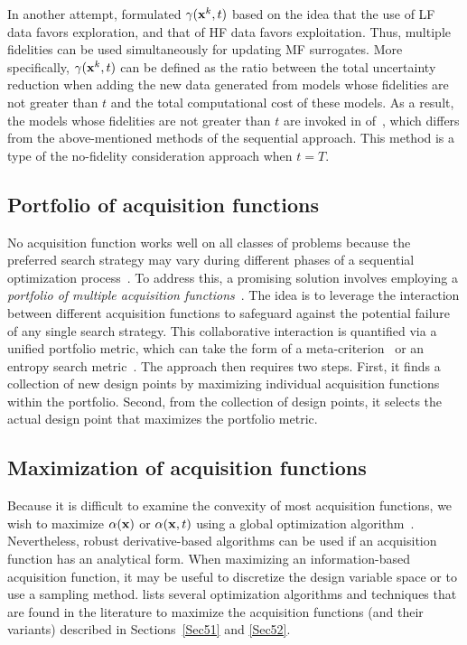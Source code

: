 \documentclass[journal ]{new-aiaa}
\begin{document}
In another attempt, \citet{Meliani2019} formulated $\gamma({\bf x}^k,t)$ based on the idea that the use of LF data favors exploration, and that of HF data favors exploitation.
Thus, multiple fidelities can be used simultaneously for updating MF surrogates.
More specifically, $\gamma({\bf x}^k,t)$ can be defined as the ratio between the total uncertainty reduction when adding the new data generated from models whose fidelities are not greater than $t$ and the total computational cost of these models.
As a result, the models whose fidelities are not greater than $t$ are invoked in  of~, which differs from the above-mentioned methods of the sequential approach.
This method is a type of the no-fidelity consideration approach when $t=T$.

\subsection{Portfolio of acquisition functions}\label{Sec53}

No acquisition function works well on all classes of problems because the preferred search strategy may vary during different phases of a sequential optimization process~\citep{Shahriari2016}.
To address this, a promising solution involves employing a \textit{portfolio of multiple acquisition functions}~\citep{Hoffman2014,Shahriari2014}.
The idea is to leverage the interaction between different acquisition functions to safeguard against the potential failure of any single search strategy.
This collaborative interaction is quantified via a unified portfolio metric, which can take the form of a meta-criterion~\citep{Hoffman2014} or an entropy search metric~\citep{Shahriari2014}.
The approach then requires two steps.
First, it finds a collection of new design points by maximizing individual acquisition functions within the portfolio.
Second, from the collection of design points, it selects the actual design point that maximizes the portfolio metric.

\subsection{Maximization of acquisition functions}\label{Sec54}

Because it is difficult to examine the convexity of most acquisition functions, we wish to maximize $\alpha({\bf x})$ or $\alpha({\bf x},t)$ using a global optimization algorithm~\citep{Neumaier2004}.
Nevertheless, robust derivative-based algorithms can be used if an acquisition function has an analytical form.
When maximizing an information-based acquisition function, it may be useful to discretize the design variable space or to use a sampling method.
 lists several optimization algorithms and techniques that are found in the literature to maximize the acquisition functions (and their variants) described in Sections~\ref{Sec51} and \ref{Sec52}.
\end{document}
